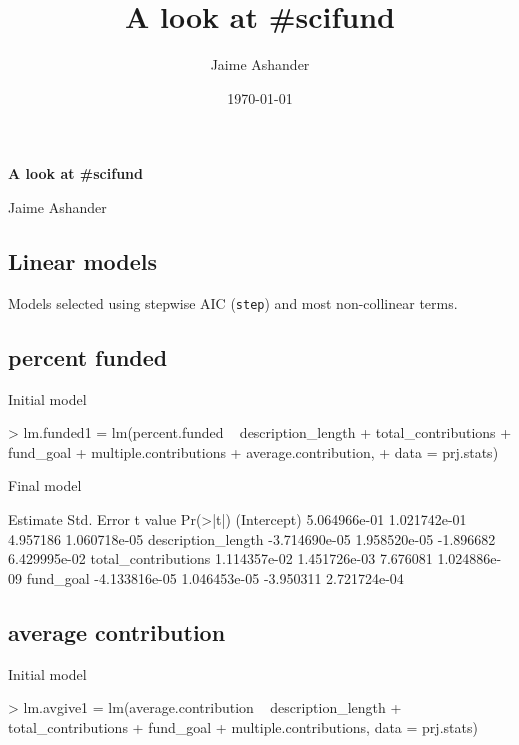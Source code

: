 \documentclass[11pt, reqno]{amsart}
\title{A look at \#scifund}
\author{Jaime Ashander}
\date{\today}
\numberwithin{equation}{section}
\begin{document}
\begin{center}
{\bf  A look at \#scifund}
  
  Jaime Ashander
  \end{center}


\subsection*{Linear models}

Models selected using stepwise AIC ({\tt step}) and most non-collinear terms. 



\subsection*{percent funded} 

Initial model
\begin{Schunk}
\begin{Sinput}
> lm.funded1 = lm(percent.funded ~ description_length + total_contributions + fund_goal + multiple.contributions + average.contribution, 
+     data = prj.stats)
\end{Sinput}
\end{Schunk}


Final model
\begin{Schunk}
\begin{Soutput}
                         Estimate   Std. Error   t value     Pr(>|t|)
(Intercept)          5.064966e-01 1.021742e-01  4.957186 1.060718e-05
description_length  -3.714690e-05 1.958520e-05 -1.896682 6.429995e-02
total_contributions  1.114357e-02 1.451726e-03  7.676081 1.024886e-09
fund_goal           -4.133816e-05 1.046453e-05 -3.950311 2.721724e-04
\end{Soutput}
\end{Schunk}


\subsection*{average contribution}

Initial model 
\begin{Schunk}
\begin{Sinput}
> lm.avgive1 = lm(average.contribution ~ description_length + total_contributions + fund_goal + multiple.contributions, data = prj.stats)
\end{Sinput}
\end{Schunk}
\end{document}
